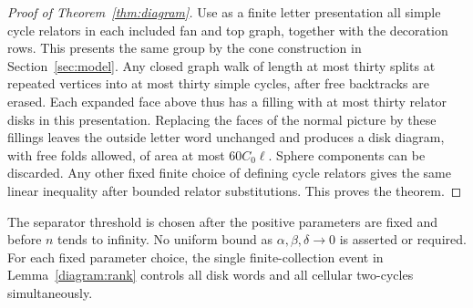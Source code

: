 \begin{proof}[Proof of Theorem~\ref{thm:diagram}]
Use as a finite letter presentation all simple cycle relators in each
included fan and top graph, together with the decoration rows.  This
presents the same group by the cone construction in
Section~\ref{sec:model}.  Any closed graph walk of length at most
thirty splits at repeated vertices into at most thirty simple cycles,
after free backtracks are erased.  Each expanded face above thus has
a filling with at most thirty relator disks in this presentation.
Replacing the faces of the normal picture by these fillings leaves
the outside letter word unchanged and produces a disk diagram, with
free folds allowed, of area at most
$60C_0\ell$.  Sphere components can be discarded.  Any other fixed
finite choice of defining cycle relators gives the same linear
inequality after bounded relator substitutions.  This proves the
theorem.
\end{proof}

\begin{remark}\label{diagram:quantifiers}
The separator threshold is chosen after the positive parameters are
fixed and before $n$ tends to infinity.  No uniform bound as
$\alpha,\beta,\delta\longrightarrow0$ is asserted or required.
For each fixed parameter choice, the single finite-collection event in
Lemma~\ref{diagram:rank} controls all disk words and all cellular
two-cycles simultaneously.
\end{remark}
